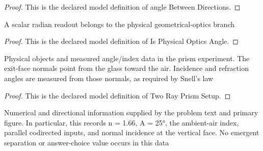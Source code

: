 \begin{proof}
  This is the declared model definition of angle Between Directions.
\end{proof}
\begin{definition}
  \label{def:physics:phyx-mini-0099:phyxminiproblems-problemphyxmini0099-isphysicalopticsangle}
  A scalar radian readout belongs to the physical geometrical-optics branch
\end{definition}
\begin{proof}
  This is the declared model definition of Is Physical Optics Angle.
\end{proof}
\begin{definition}
  \label{def:physics:phyx-mini-0099:phyxminiproblems-problemphyxmini0099-tworayprismsetup}
  Physical objects and measured angle/index data in the prism experiment. The exit-face normals point from the glass toward the air. Incidence and refraction angles are measured from those normals, as required by Snell's law
\end{definition}
\begin{proof}
  This is the declared model definition of Two Ray Prism Setup.
\end{proof}
\begin{definition}
  \label{def:physics:phyx-mini-0099:phyxminiproblems-problemphyxmini0099-matchesproblemandfigure}
  Numerical and directional information supplied by the problem text and primary figure. In particular, this records n = 1.66, A = 25°, the ambient-air index, parallel codirected inputs, and normal incidence at the vertical face. No emergent separation or answer-choice value occurs in this data
\end{definition}
